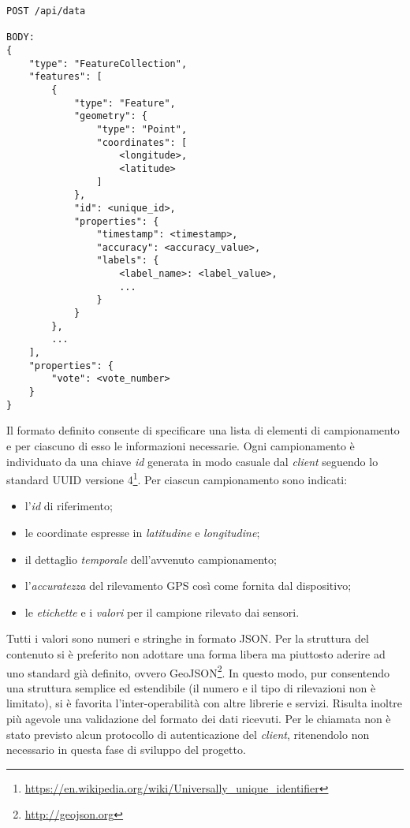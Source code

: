 \begin{lstlisting}[caption=Invocazione API di invio dati,label=response-data]
POST /api/data

BODY: 
{
    "type": "FeatureCollection",
    "features": [
        {
            "type": "Feature",
            "geometry": {
                "type": "Point",
                "coordinates": [
                    <longitude>,
                    <latitude>
                ]
            },
            "id": <unique_id>,
            "properties": {
                "timestamp": <timestamp>,
                "accuracy": <accuracy_value>,
                "labels": {
                    <label_name>: <label_value>,
                    ...
                }
            }
        },
        ...
    ],
    "properties": {
        "vote": <vote_number>
    }
}
\end{lstlisting}
 Il formato definito consente di specificare una lista di elementi di campionamento e per ciascuno di esso le informazioni necessarie. Ogni campionamento è individuato da una chiave \emph{id} generata in modo casuale dal \emph{client} seguendo lo standard UUID versione 4\footnote{\url{https://en.wikipedia.org/wiki/Universally_unique_identifier}}. Per ciascun campionamento sono indicati:
\begin{itemize}
	\item l'\emph{id} di riferimento;
	\item le coordinate espresse in \emph{latitudine} e \emph{longitudine};
	\item il dettaglio \emph{temporale} dell'avvenuto campionamento;
	\item l'\emph{accuratezza} del rilevamento GPS così come fornita dal dispositivo;
	\item le \emph{etichette} e i \emph{valori} per il campione rilevato dai sensori.
\end{itemize}
Tutti i valori sono numeri e stringhe in formato JSON. Per la struttura del contenuto si è preferito non adottare una forma libera ma piuttosto aderire ad uno standard già definito, ovvero GeoJSON\footnote{\url{http://geojson.org}}. In questo modo, pur consentendo una struttura semplice ed estendibile (il numero e il tipo di rilevazioni non è limitato), si è favorita l'inter-operabilità con altre librerie e servizi. Risulta inoltre più agevole una validazione del formato dei dati ricevuti.
Per le chiamata non è stato previsto alcun protocollo di autenticazione del \emph{client}, ritenendolo non necessario in questa fase di sviluppo del progetto.

